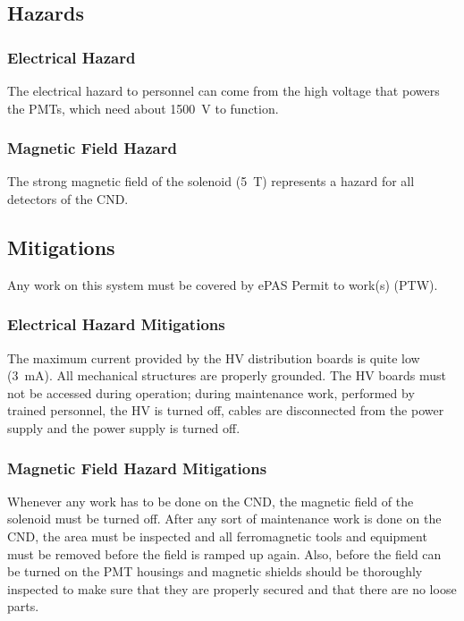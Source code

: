 \subsection{Hazards} 

\subsubsection{Electrical Hazard}

The electrical hazard to personnel can come from the high voltage that powers the PMTs, which 
need about 1500~V to function. 

\subsubsection{Magnetic Field Hazard}

The strong magnetic field of the solenoid (5~T) represents a hazard for all detectors of the
CND.

\subsection{Mitigations}
Any work on this system must be covered by ePAS Permit to work(s) (PTW).

\subsubsection{Electrical Hazard Mitigations} 

The maximum current provided by the HV distribution boards is quite low (3~mA). All mechanical 
structures are properly grounded. The HV boards must not be accessed during operation; during 
maintenance work, performed by trained personnel, the HV is turned off, cables are disconnected 
from the power supply and the power supply is turned off. 

\subsubsection{Magnetic Field Hazard Mitigations}

Whenever any work has to be done on the CND, the magnetic field of the solenoid must be turned 
off. After any sort of maintenance work is done on the CND, the area must be inspected and all 
ferromagnetic tools and equipment must be removed before the field is ramped up again. Also, 
before the field can be turned on the PMT housings and magnetic shields should be thoroughly 
inspected to make sure that they are properly secured and that there are no loose parts. 

